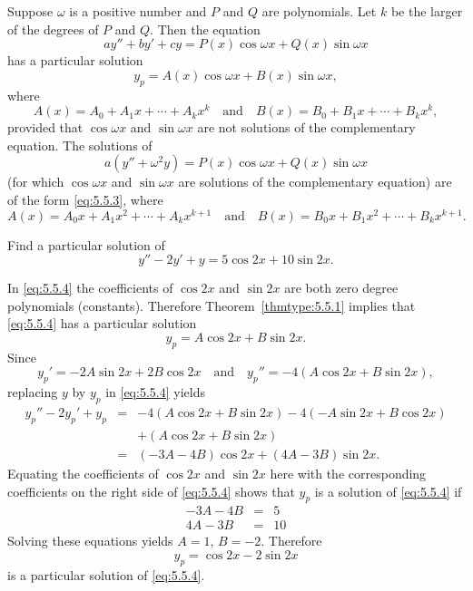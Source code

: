\documentclass{ximera}
\begin{document}
\begin{theorem}\label{thmtype:5.5.1}
Suppose $\omega$ is a positive number and $P$ and $Q$ are
polynomials. Let $k$ be the larger of the degrees of $P$ and $Q$. Then
the equation
$$
ay''+by'+cy=P(x)\cos \omega x+Q(x)\sin \omega x
$$
has a particular solution
\begin{equation} \label{eq:5.5.3}
y_p=A(x)\cos\omega x+B(x)\sin\omega x,
\end{equation}
where
$$
A(x)=A_0+A_1x+\cdots+A_kx^k\quad \mbox{and}\quad
B(x)=B_0+B_1x+\cdots+B_kx^k,
$$
provided that $\cos\omega x$ and $\sin\omega x$ are
not solutions of  the complementary equation. The solutions of
$$
a(y''+\omega^2y)=P(x)\cos \omega x+Q(x)\sin \omega x
$$
(for which $\cos\omega x$ and $\sin\omega x$ are solutions of the
complementary equation) are of the form \eqref{eq:5.5.3},
where
$$
A(x)=A_0x+A_1x^2+\cdots+A_kx^{k+1}\quad \mbox{and}\quad
B(x)=B_0x+B_1x^2+\cdots+B_kx^{k+1}.
$$
\end{theorem}


\begin{example}\label{example:5.5.1}
Find a particular solution of
\begin{equation} \label{eq:5.5.4}
y''-2y'+y=5\cos2x+10\sin2x.
\end{equation}


\begin{explanation}
In \eqref{eq:5.5.4} the coefficients of $\cos2x$ and $\sin2x$ are both zero
degree polynomials (constants). Therefore Theorem~\ref{thmtype:5.5.1}
implies that \eqref{eq:5.5.4} has a particular solution
$$
y_p=A\cos2x+B\sin2x.
$$
Since
$$
y_p'=-2A\sin2x+2B\cos2x\quad\mbox{and}\quad
y_p''=-4(A\cos2x+B\sin2x),
$$
replacing $y$ by $y_p$ in  \eqref{eq:5.5.4} yields
\begin{eqnarray*}
y_p''-2y_p'+y_p&=&-4(A\cos2x+B\sin2x)-4(-A\sin2x+B\cos2x)
\\ &&+(A\cos2x+B\sin2x)\\ &=&
(-3A-4B)\cos2x+(4A-3B)\sin2x.
\end{eqnarray*}
Equating the coefficients of $\cos2x$ and $\sin2x$ here with the
corresponding coefficients on the right side of \eqref{eq:5.5.4}
shows that $y_p$ is a solution of \eqref{eq:5.5.4}  if
\begin{eqnarray*}
-3A-4B&=&5\\
4A-3B&=&10
\end{eqnarray*}
Solving these equations yields $A=1$, $B=-2$.  Therefore
$$
y_p=\cos2x-2\sin2x
$$
is a particular solution of \eqref{eq:5.5.4}.
\end{explanation}
\end{example}
\end{document}
